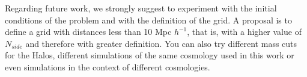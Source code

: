 \documentclass[usenatbib]{mnras}
\begin{document}
Regarding future work, we strongly suggest to experiment with the initial conditions of the problem and with the definition of the grid. A proposal is to define a grid with distances less than 10 Mpc $h^{-1}$, that is, with a higher value of $N_{side}$ and therefore with greater definition. You can also try different mass cuts for the Halos, different simulations of the same cosmology used in this work or even simulations in the context of different cosmologies.\\



\end{document}
